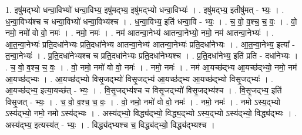 \documentclass[17pt]{extarticle}
\begin{document}
1. इषु॑मद्भ्यो धन्वा॒विभ्यो॑ धन्वा॒विभ्य॒ इषु॑मद्भ्य॒ इषु॑मद्भ्यो धन्वा॒विभ्यः॑ । . इषु॑मद्भ्य॒ इतीषु॑मत् - भ्यः॒ । . ध॒न्वा॒विभ्य॑श्च च धन्वा॒विभ्यो॑ धन्वा॒विभ्य॑श्च । . ध॒न्वा॒विभ्य॒ इति॑ धन्वा॒वि - भ्यः॒ । . च॒ वो॒ व॒श्च॒ च॒ वः॒ । . वो॒ नमो॒ नमो॑ वो वो॒ नमः॑ । . नमो॒ नमः॑ । . नम॑ आतन्वा॒नेभ्य॑ आतन्वा॒नेभ्यो॒ नमो॒ नम॑ आतन्वा॒नेभ्यः॑ । . आ॒त॒न्वा॒नेभ्यः॑ प्रति॒दधा॑नेभ्यः प्रति॒दधा॑नेभ्य आतन्वा॒नेभ्य॑ आतन्वा॒नेभ्यः॑ प्रति॒दधा॑नेभ्यः । . आ॒त॒न्वा॒नेभ्य॒ इत्या᳚ - त॒न्वा॒नेभ्यः॑ । . प्र॒ति॒दधा॑नेभ्यश्च च प्रति॒दधा॑नेभ्यः प्रति॒दधा॑नेभ्यश्च । . प्र॒ति॒दधा॑नेभ्य॒ इति॑ प्रति - दधा॑नेभ्यः । . च॒ वो॒ व॒श्च॒ च॒ वः॒ । . वो॒ नमो॒ नमो॑ वो वो॒ नमः॑ । . नमो॒ नमः॑ । . नम॑ आ॒यच्छ॑द्भ्य आ॒यच्छ॑द्भ्यो॒ नमो॒ नम॑ आ॒यच्छ॑द्भ्यः । . आ॒यच्छ॑द्भ्यो विसृ॒जद्भ्यो॑ विसृ॒जद्भ्य॑ आ॒यच्छ॑द्भ्य आ॒यच्छ॑द्भ्यो विसृ॒जद्भ्यः॑ । . आ॒यच्छ॑द्भ्य॒ इत्या॒यच्छ॑त् - भ्यः॒ । . वि॒सृ॒जद्भ्य॑श्च च विसृ॒जद्भ्यो॑ विसृ॒जद्भ्य॑श्च । . वि॒सृ॒जद्भ्य॒ इति॑ विसृ॒जत् - भ्यः॒ । . च॒ वो॒ व॒श्च॒ च॒ वः॒ । . वो॒ नमो॒ नमो॑ वो वो॒ नमः॑ । . नमो॒ नमः॑ । . नमो ऽस्य॒द्भ्यो ऽस्य॑द्भ्यो॒ नमो॒ नमो ऽस्य॑द्भ्यः । . अस्य॑द्भ्यो॒ विद्ध्य॑द्भ्यो॒ विद्ध्य॒द्भ्यो ऽस्य॒द्भ्यो ऽस्य॑द्भ्यो॒ विद्ध्य॑द्भ्यः । . अस्य॑द्भ्य॒ इत्यस्य॑त् - भ्यः॒ । . विद्ध्य॑द्भ्यश्च च॒ विद्ध्य॑द्भ्यो॒ विद्ध्य॑द्भ्यश्च । \newline
\end{document}
